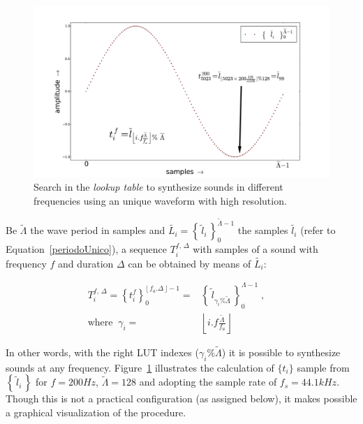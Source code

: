 \documentclass[
 aip,
 jmp,
 amsmath,amssymb,
 reprint,
]{revtex4-1}
\begin{document}
\begin{figure}[h!]
    \centering
        \includegraphics[width=\columnwidth]{figures/lut}
    \caption{Search in the \emph{lookup table} to synthesize sounds in different frequencies using an unique waveform with high resolution.}
        \label{fig:lut}                                                                                                            
\end{figure}

Be $\widetilde{\Lambda}$ the wave period in samples and $\widetilde{L_i} = \left\{\, \widetilde{l}_i \,\right\}_0^{\widetilde{\Lambda} -1}$ the samples $\widetilde{l_i}$ (refer to Equation~\ref{periodoUnico}), a sequence $T_i^{f,\,\Delta}$ with samples of a sound with frequency $f$ and duration $\Delta$ can be obtained by means of $\widetilde{L_i}$:

\begin{equation}\label{eq:lut}
\begin{split}
T_i^{f,\,\Delta}=\left\{t_i^f\right\}_0^{\lfloor \, f_a . \Delta \, \rfloor -1} = & \left\{ \, \widetilde{l}_{\gamma_i \% \widetilde{\Lambda} }\, \right\}_{0}^{\Lambda-1}\; , \quad \\ \text{where} \;\; \gamma_i = & \left \lfloor i . f \frac{ \widetilde{\Lambda}}{f_a} \right \rfloor  
\end{split}
\end{equation}

In other words, with the right LUT indexes ($\gamma_i\%\widetilde{\Lambda}$) it is possible to synthesize sounds at any frequency. Figure~\ref{fig:lut} illustrates the calculation of $\{t_i\}$ sample from $\left\{\,\widetilde{l}_i\,\right\}$ for $f=200Hz$, $\widetilde{\Lambda}=128$ and adopting the sample rate of $f_s=44.1kHz$.
Though this is not a practical configuration (as assigned below), it makes possible a graphical visualization of the procedure.
\end{document}
